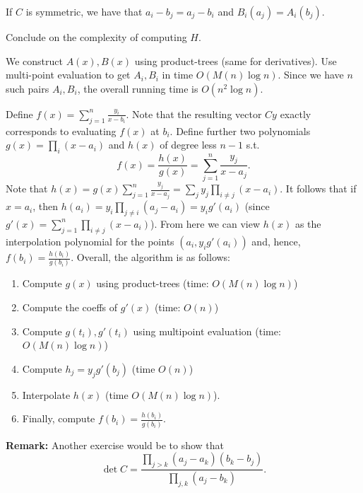 \documentclass[11pt]{exam}
\theoremstyle{definition}
\begin{document}
{\begin{questions}
\begin{solution}
		If $C$ is symmetric, we have that $a_i-b_j = a_j - b_i$ and $B_i(a_j) = A_i(b_j)$.
	\end{solution}
	\question Conclude on the complexity of computing $H$.
	\begin{solution}
		We construct $A(x), B(x)$ using product-trees (same for derivatives). Use multi-point evaluation to get $A_i, B_i$ in time $O(M(n) \log n)$. Since we have $n$ such pairs $A_i, B_i$, the overall running time is $O(n^2 \log n)$.
	\end{solution}
	\begin{solution}
		Define $f(x) = \sum_{j=1}^n  \frac{y_i}{x-b_i}$. Note that the resulting vector $Cy$ exactly corresponds to evaluating $f(x)$ at $b_i$. Define further two polynomials $g(x) = \prod_i (x-a_i)$ and $h(x)$ of degree less $n-1$ s.t.\ 
		\[
			f(x) = \frac{h(x)}{g(x)} = \sum_{j=1}^n \frac{y_j}{x-a_j}. 
		\]
		Note that $h(x) = g(x) \sum_{j=1}^n \frac{y_j}{x-a_j} = \sum_j y_j \prod_{i \neq j} (x-a_i)$. It follows that
		if $x=a_i$, then $h(a_i) = y_i \prod_{j \neq i} (a_j - a_i) = y_i g'(a_i)$ (since $g'(x) = \sum_{j=1}^n \prod_{i \neq j} (x -a_i)$). From here we can view $h(x)$ as the interpolation polynomial for the points $(a_i, y_ig'(a_i))$ and, hence, $f(b_i) = \frac{h(b_i)}{g(b_i)}$. Overall, the algorithm is as follows:
		\begin{enumerate}
			\item Compute $g(x)$ using product-trees (time: $O(M(n)\log n)$)
			\item Compute the coeffs of $g'(x)$ (time: $O(n)$)
			\item Compute $g(t_i), g'(t_i)$ using multipoint evaluation (time: $O(M(n)\log n)$)
			\item Compute $h_j = y_j g'(b_j)$ (time $O(n)$)
			\item Interpolate $h(x)$ (time $O(M(n)\log n)$).
			\item Finally, compute $f(b_i) = \frac{h(b_i)}{g(b_i)}$.
		\end{enumerate}
	\textbf{Remark:} Another exercise would be to show that 
	\[
		\det C  = \frac{\prod_{j>k} (a_j - a_k)(b_k - b_j)}{\prod_{j,k} (a_j - b_k)}.
	\]
	\end{solution}
\end{questions}





}
\end{document}
